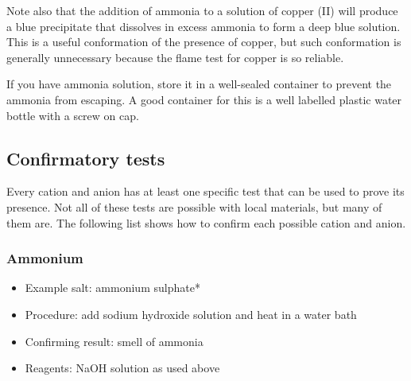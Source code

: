 Note also that the addition of ammonia to a solution of copper (II) will produce a blue precipitate that dissolves in excess ammonia to form a deep blue solution. This is a useful conformation of the presence of copper, but such conformation is generally unnecessary because the flame test for copper is so reliable.

If you have ammonia solution, store it in a well-sealed container to prevent the ammonia from escaping. A good container for this is a well labelled plastic water bottle with a screw on cap.

\subsection{Confirmatory tests}

Every cation and anion has at least one specific test that can be used to prove its presence. Not all of these tests are possible with local materials, but many of them are. The following list shows how to confirm each possible cation and anion.

\subsubsection{Ammonium}
\begin{itemize}
\item{Example salt: ammonium sulphate*}
\item{Procedure: add sodium hydroxide solution and heat in a water bath}
\item{Confirming result: smell of ammonia} 
\item{Reagents: NaOH solution as used above}
\end{itemize}

